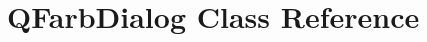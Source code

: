 \hypertarget{classGUI_1_1QtGui_1_1QFarbDialog}{}\section{Q\+Farb\+Dialog Class Reference}
\label{classGUI_1_1QtGui_1_1QFarbDialog}
